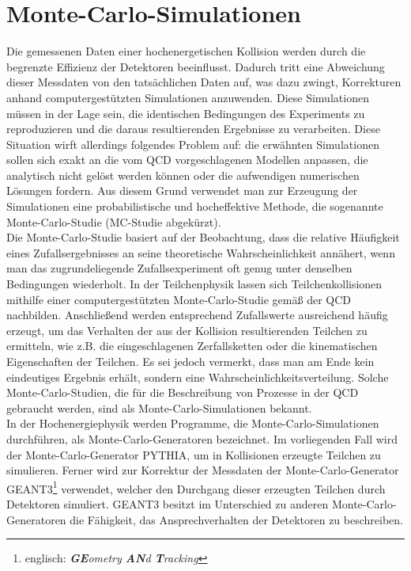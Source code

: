 \documentclass[12pt,a4paper]{report}
\begin{document}
\section{Monte-Carlo-Simulationen}
\label{sec:MC}
Die gemessenen Daten einer hochenergetischen Kollision werden durch die begrenzte Effizienz der Detektoren beeinflusst. Dadurch tritt eine Abweichung dieser Messdaten von den tatsächlichen Daten auf, was dazu zwingt, Korrekturen anhand computergestützten Simulationen anzuwenden. Diese Simulationen müssen in der Lage sein, die identischen Bedingungen des Experiments zu reproduzieren und die daraus resultierenden Ergebnisse zu verarbeiten. Diese Situation wirft allerdings folgendes Problem auf: die erwähnten Simulationen sollen sich exakt an die vom QCD vorgeschlagenen Modellen anpassen, die analytisch nicht gelöst werden können oder die aufwendigen numerischen Lösungen fordern. Aus diesem Grund verwendet man zur Erzeugung der Simulationen eine probabilistische und hocheffektive Methode, die sogenannte Monte-Carlo-Studie (MC-Studie abgekürzt)\cite{PHUHN15}.\\ 
Die Monte-Carlo-Studie basiert auf der Beobachtung, dass die relative Häufigkeit eines Zufallsergebnisses an seine theoretische Wahrscheinlichkeit annähert, wenn man das zugrundeliegende Zufallsexperiment oft genug unter denselben Bedingungen wiederholt. In der Teilchenphysik lassen sich Teilchenkollisionen mithilfe einer computergestützten Monte-Carlo-Studie gemäß der QCD nachbilden. Anschließend werden entsprechend Zufallswerte ausreichend häufig erzeugt, um das Verhalten der aus der Kollision resultierenden Teilchen zu ermitteln, wie z.B. die eingeschlagenen Zerfallsketten oder die kinematischen Eigenschaften der Teilchen. Es sei jedoch vermerkt, dass man am Ende kein eindeutiges Ergebnis erhält, sondern eine Wahrscheinlichkeitsverteilung. Solche Monte-Carlo-Studien, die für die Beschreibung von Prozesse in der QCD gebraucht werden, sind als Monte-Carlo-Simulationen bekannt.\\
In der Hochenergiephysik werden Programme, die Monte-Carlo-Simulationen durchführen, als Monte-Carlo-Generatoren bezeichnet. Im vorliegenden Fall wird der Monte-Carlo-Generator PYTHIA, um in Kollisionen erzeugte Teilchen zu simulieren. Ferner wird zur Korrektur der Messdaten der Monte-Carlo-Generator GEANT3\footnote{englisch: \textit{\textbf{GE}ometry \textbf{AN}d \textbf{T}racking}} verwendet, welcher den Durchgang dieser erzeugten Teilchen durch Detektoren simuliert. GEANT3 besitzt im Unterschied zu anderen Monte-Carlo-Generatoren die Fähigkeit, das Ansprechverhalten der Detektoren zu beschreiben. 
\end{document}
